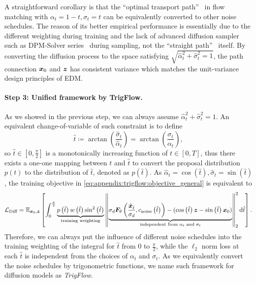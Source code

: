 A straightforward corollary is that the ``optimal transport path''~\citep{lipman2022flowmatching} in flow matching with $\alpha_t = 1 - t, \sigma_t = t$ can be equivalently converted to other noise schedules. The reason of its better empirical performance is essentially due to the different weighting during training and the lack of advanced diffusion sampler such as DPM-Solver series~\citep{lu2022dpm,lu2022dpm++} during sampling, not the ``straight path''~\citep{lipman2022flowmatching} itself. By converting the diffusion process to the space satisfying $\sqrt{\hat\alpha_t^2+\hat\sigma_t^2=1}$, the path connection ${\bm{x}}_0$ and ${\bm{z}}$ has consistent variance which matches the unit-variance design principles of EDM.


\paragraph{Step 3: Unified framework by TrigFlow.}
As we showed in the previous step, we can always assume $\hat\alpha_t^2 + \hat\sigma_t^2 = 1$. An equivalent change-of-variable of such constraint is to define
\begin{equation}
    \hat{t} \coloneqq \arctan\left(\frac{\hat\sigma_t}{\hat\alpha_t}\right) = \arctan\left(\frac{\sigma_t}{\alpha_t}\right),
\end{equation}
so $\hat{t}\in [0, \frac{\pi}{2}]$ is a monotonically increasing function of $t \in [0, T]$, thus there exists a one-one mapping between $t$ and $\hat{t}$ to convert the proposal distribution $p(t)$ to the distribution of $\hat{t}$, denoted as $p\left(\hat{t}\right)$. As $\hat\alpha_t = \cos\left(\hat t\right), \hat\sigma_t = \sin\left(\hat t\right)$, the training objective in \eqref{eq:appendix:trigflow:objective_general} is equivalent to
\begin{equation}
    {\mathcal{L}}_{\text{Diff}} = \mathbb{E}_{{\bm{x}}_0,{\bm{z}}}\left[
        \int_0^{\frac{\pi}{2}} \underbrace{p\left(\hat{t}\right) w\left(\hat{t}\right)\sin^2\left(\hat{t}\right)}_{\text{training weighting}} 
        \left\| \underbrace{\sigma_d{\bm{F}}_\theta\left(\frac{\hat{{\bm{x}}}_{\hat{t}}}{\sigma_d}, c_{\text{noise}}\left(\hat{t}\right)\right)
        - (\cos\left(\hat{t}\right) {\bm{z}} - \sin\left(\hat{t}\right) {\bm{x}}_0)}_{\text{independent from $\alpha_t$ and $\sigma_t$}}
        \right\|_2^2 \mathrm{d} \hat{t}
    \right]. 
\end{equation}
Therefore, we can always put the influence of different noise schedules into the training weighting of the integral for $\hat{t}$ from $0$ to $\frac{\pi}{2}$, while the $\ell_2$ norm loss at each $\hat{t}$ is independent from the choices of $\alpha_t$ and $\sigma_t$. As we equivalently convert the noise schedules by trigonometric functions, we name such framework for diffusion models as \textit{TrigFlow}.

